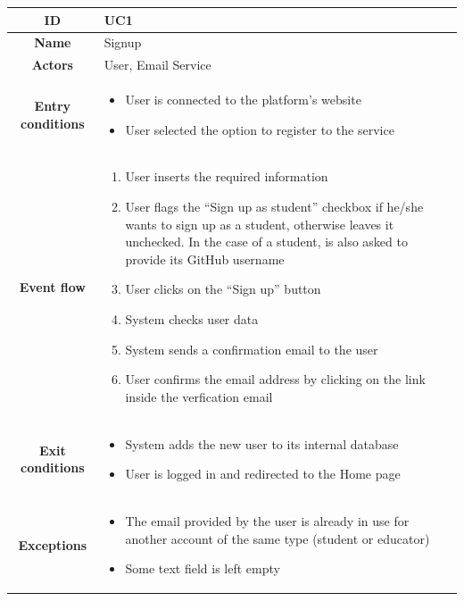 \begin{center}
    \begin{tabular}{ |c|m{10cm}| }
        \hline
        \textbf{ID} & UC1 \\
        \hline
        \textbf{Name} & Signup \\
        \hline
        \textbf{Actors} & User, Email Service \\
        \hline
        \textbf{Entry conditions} &
        \begin{itemize}
            \item User is connected to the platform’s website
            \item User selected the option to register to the service
        \end{itemize} \\
        \hline
        \textbf{Event flow} &
        \begin{enumerate}
            \item User inserts the required information
            \item User flags the “Sign up as student” checkbox if he/she wants to sign up as a student, otherwise leaves it unchecked. In the case of a student, is also asked to provide its GitHub username
            \item User clicks on the “Sign up” button
            \item System checks user data
            \item System sends a confirmation email to the user
            \item User confirms the email address by clicking on the link inside the verfication email
        \end{enumerate} \\
        \hline
        \textbf{Exit conditions} &
        \begin{itemize}
            \item System adds the new user to its internal database
            \item User is logged in and redirected to the Home page
        \end{itemize} \\
        \hline
        \textbf{Exceptions} & 
        \begin{itemize}
            \item The email provided by the user is already in use for another account of the same type (student or educator)
            \item Some text field is left empty

\end{itemize}
\end{tabular}
\end{center}
